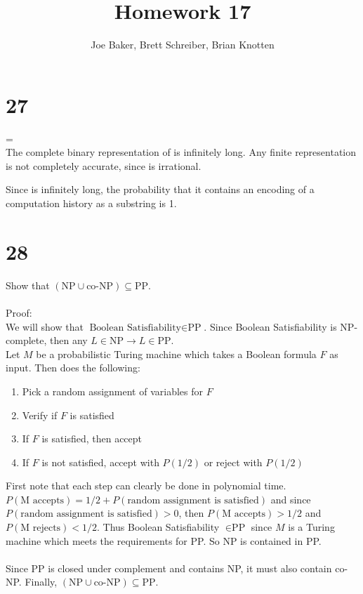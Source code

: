 \documentclass[letterpaper,notitlepage,twoside]{article}
\begin{document}
\title{Homework 17}
\author{Joe Baker, Brett Schreiber, Brian Knotten}
\maketitle

\section*{27}
\rho =  \\
The complete binary representation of  is infinitely long. Any finite representation is not completely accurate, since  is irrational.

Since  is infinitely long, the probability that it contains an encoding of a computation history as a substring is 1.


\section*{28}
Show that $\left(\text{NP}\cup\text{co-NP}\right)\subseteq\text{PP}$.
\\\\
Proof:
\\
We will show that $\text{Boolean Satisfiability}\in\text{PP}$. Since Boolean Satisfiability is NP-complete, then any $L \in \text{NP} \rightarrow L \in \text{PP}$.
\\
Let $M$ be a probabilistic Turing machine which takes a Boolean formula $F$ as input. Then does the following:
\begin{enumerate}
\item Pick a random assignment of variables for $F$
\item Verify if $F$ is satisfied
\item If $F$ is satisfied, then accept
\item If $F$ is not satisfied, accept with $P(1/2)$ or reject with $P(1/2)$
\end{enumerate}
First note that each step can clearly be done in polynomial time. $P(\text{M accepts}) = 1/2 + P(\text{random assignment is satisfied})$ and since $P(\text{random assignment is satisfied}) > 0$, then $P(\text{M accepts}) > 1/2$ and $P(\text{M rejects}) < 1/2$. Thus Boolean Satisfiability $\in \text{PP}$ since $M$ is a Turing machine which meets the requirements for PP. So NP is contained in PP.
\\\\
Since PP is closed under complement and contains NP, it must also contain co-NP. Finally, $\left(\text{NP}\cup\text{co-NP}\right)\subseteq\text{PP}$.
\end{document}
